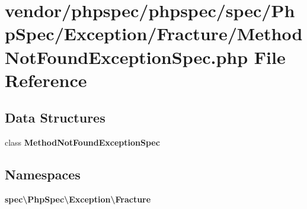\section{vendor/phpspec/phpspec/spec/\+Php\+Spec/\+Exception/\+Fracture/\+Method\+Not\+Found\+Exception\+Spec.php File Reference}
\label{phpspec_2spec_2_php_spec_2_exception_2_fracture_2_method_not_found_exception_spec_8php}
\subsection*{Data Structures}
\begin{DoxyCompactItemize}
\item 
class {\bf Method\+Not\+Found\+Exception\+Spec}
\end{DoxyCompactItemize}
\subsection*{Namespaces}
\begin{DoxyCompactItemize}
\item 
 {\bf spec\textbackslash{}\+Php\+Spec\textbackslash{}\+Exception\textbackslash{}\+Fracture}
\end{DoxyCompactItemize}
